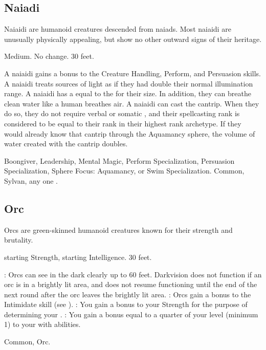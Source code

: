     \subsection{Naiadi}

        Naiaidi are humanoid creatures descended from naiads.
        Most naiaidi are unusually physically appealing, but show no other outward signs of their heritage.

         Medium.
         No change.
         30 feet.
        \begin{itemize}
             A naiaidi gains a  bonus to the Creature Handling, Perform, and Persuasion skills.
             A naiaidi treats sources of light as if they had double their normal illumination range.
             A naiaidi has a  equal to the  for their size.
                In addition, they can breathe clean water like a human breathes air.
             A naiaidi can cast the  cantrip.
                When they do so, they do not require verbal or somatic , and their spellcasting rank is considered to be equal to their rank in their highest rank archetype.
                If they would already know that cantrip through the Aquamancy sphere, the volume of water created with the cantrip doubles.
        \end{itemize}
         Boongiver, Leadership, Mental Magic, Perform Specialization, Persuasion Specialization, Sphere Focus: Aquamancy, or Swim Specialization.
         Common, Sylvan, any one .

    \subsection{Orc}
        Orcs are green-skinned humanoid creatures known for their strength and brutality.

          starting Strength,  starting Intelligence.
         30 feet.
        \begin{itemize}
            : Orcs can see in the dark clearly up to 60 feet.
                Darkvision does not function if an orc is in a brightly lit area, and does not resume functioning until the end of the next round after the orc leaves the brightly lit area.
            : Orcs gain a  bonus to the Intimidate skill (see ).
            : You gain a  bonus to your Strength for the purpose of determining your .
            : You gain a bonus equal to a quarter of your level (minimum 1) to your  with  abilities.
        \end{itemize}
         Common, Orc.

